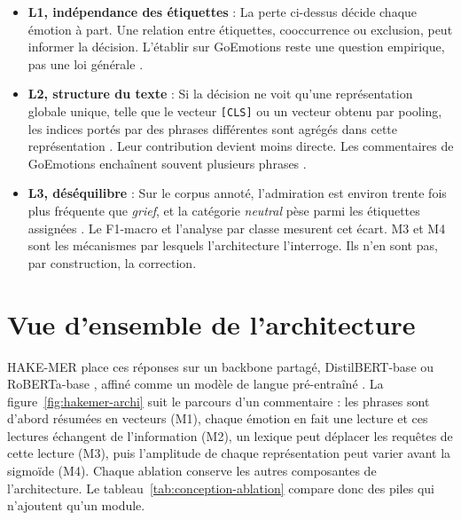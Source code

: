 \begin{itemize}
\item \textbf{L1, indépendance des étiquettes} : La perte ci-dessus
  décide chaque émotion à part. Une relation entre étiquettes,
  cooccurrence ou exclusion, peut informer la décision. L'établir sur
  GoEmotions reste une question empirique, pas une loi générale
  \cite{zhang2014multilabel,read2019classifier}.
\item \textbf{L2, structure du texte} : Si la décision ne voit qu'une
  représentation globale unique, telle que le vecteur \texttt{[CLS]} ou
  un vecteur obtenu par pooling, les indices portés par des phrases
  différentes sont agrégés dans cette représentation
  \cite{devlin2019}. Leur contribution devient moins directe. Les
  commentaires de GoEmotions enchaînent souvent plusieurs phrases
  \cite{demszky2020}.
\item \textbf{L3, déséquilibre} : Sur le corpus annoté, l'admiration est
  environ trente fois plus fréquente que \emph{grief}, et la catégorie
  \emph{neutral} pèse parmi les étiquettes assignées
  \cite{demszky2020}. Le F1-macro et l'analyse par classe mesurent cet
  écart. M3 et M4 sont les mécanismes par lesquels l'architecture
  l'interroge. Ils n'en sont pas, par construction, la correction.
\end{itemize}

\section{Vue d'ensemble de l'architecture}
\label{sec:conception-vue}

HAKE-MER place ces réponses sur un backbone partagé, DistilBERT-base
ou RoBERTa-base \cite{sanh2019distilbert,liu2019roberta}, affiné comme
un modèle de langue pré-entraîné \cite{devlin2019,sun2019}. La
figure~\ref{fig:hakemer-archi} suit le parcours d'un commentaire : les
phrases sont d'abord résumées en vecteurs (M1), chaque émotion en fait
une lecture et ces lectures échangent de l'information (M2), un lexique
peut déplacer les requêtes de cette lecture (M3), puis l'amplitude de
chaque représentation peut varier avant la sigmoïde (M4). Chaque
ablation conserve les autres composantes de l'architecture. Le
tableau~\ref{tab:conception-ablation} compare donc des piles qui
n'ajoutent qu'un module.

